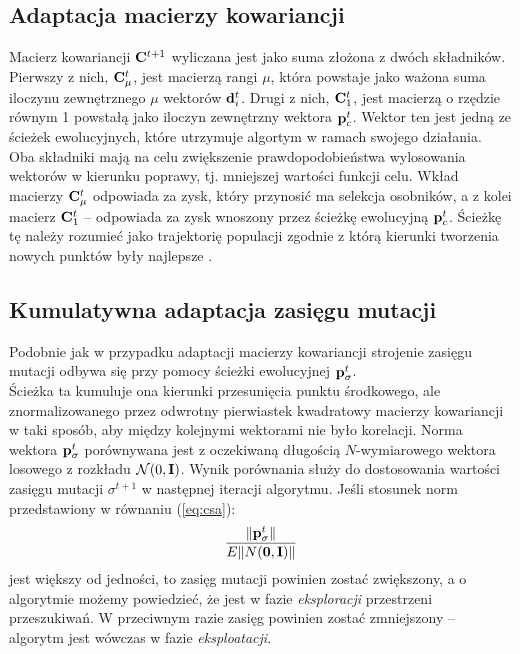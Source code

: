 \subsection{Adaptacja macierzy kowariancji \label{CMA}}
  Macierz kowariancji ${\bf C}^{t+1}$ wyliczana jest jako suma złożona z dwóch składników. Pierwszy z nich, ${\bf C}^t_\mu$, jest macierzą rangi $\mu$, która powstaje jako ważona suma iloczynu zewnętrznego $\mu$ wektorów  ${\bf d}_{i}^{t}$. Drugi z nich,  ${\bf C}^t_1$, jest macierzą o rzędzie równym 1 powstałą jako iloczyn zewnętrzny wektora ${\bf p}_c^t$. Wektor ten jest jedną ze ścieżek ewolucyjnych, które utrzymuje algortym w ramach swojego działania.\\ 
  \indent Oba składniki mają na celu zwiększenie prawdopodobieństwa wylosowania wektorów w kierunku poprawy, tj. mniejszej wartości funkcji celu. Wkład macierzy ${\bf C}^t_\mu$ odpowiada za zysk, który przynosić ma selekcja osobników, a z kolei macierz ${\bf C}^t_1$ -- odpowiada za zysk wnoszony przez ścieżkę ewolucyjną ${\bf p}_c^t$. Ścieżkę tę należy rozumieć jako trajektorię populacji zgodnie z którą kierunki tworzenia nowych punktów były najlepsze \cite{Hansen2001}.
\subsection{Kumulatywna adaptacja zasięgu mutacji \label{CSA}}
Podobnie jak w przypadku adaptacji macierzy kowariancji strojenie zasięgu mutacji odbywa się przy pomocy ścieżki ewolucyjnej ${\bf p}^{t}_\sigma$. \\
\indent Ścieżka ta kumuluje ona kierunki przesunięcia punktu środkowego, ale znormalizowanego przez odwrotny pierwiastek kwadratowy macierzy kowariancji w taki sposób, aby między kolejnymi wektorami nie było korelacji. Norma wektora ${\bf p}^{t}_\sigma$ porównywana jest z
oczekiwaną długością $N$-wymiarowego wektora losowego z rozkładu $\mathcal{N}(0, {\bf I})$. Wynik porównania służy do dostosowania 
wartości zasięgu mutacji $\sigma^{t+1}$ w następnej iteracji algorytmu. Jeśli stosunek norm przedstawiony w równaniu (\ref{eq:csa}):
\begin{equation}
    \label{eq:csa}
    \frac{\|{\bf p}_\sigma^{t}\|}{E\|N({\bf 0},{\bf I})\|}
\end{equation}  
jest większy od jedności, to zasięg mutacji powinien zostać zwiększony, a o algorytmie możemy powiedzieć, że jest w fazie \textit{eksploracji} przestrzeni przeszukiwań. W przeciwnym razie zasięg powinien zostać zmniejszony -- algorytm jest wówczas w fazie \textit{eksploatacji}.

